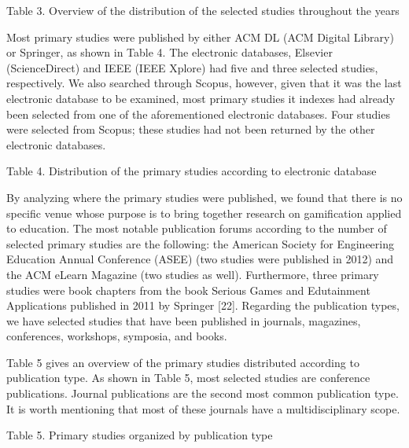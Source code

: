 Table 3. Overview of the distribution of the selected studies
throughout the years

Most primary studies were published by either ACM DL (ACM
Digital Library) or Springer, as shown in Table 4. The electronic
databases, Elsevier (ScienceDirect) and IEEE (IEEE Xplore) had
five and three selected studies, respectively. We also searched
through Scopus, however, given that it was the last electronic
database to be examined, most primary studies it indexes had
already been selected from one of the aforementioned electronic
databases. Four studies were selected from Scopus; these studies
had not been returned by the other electronic databases. 

Table 4. Distribution of the primary studies according to
electronic database

By analyzing where the primary studies were published, we found
that there is no specific venue whose purpose is to bring together
research on gamification applied to education. The most notable
publication forums according to the number of selected primary
studies are the following: the American Society for Engineering
Education Annual Conference (ASEE) (two studies were published
in 2012) and the ACM eLearn Magazine (two studies as well).
Furthermore, three primary studies were book chapters from the
book Serious Games and Edutainment Applications published in
2011 by Springer [22].
Regarding the publication types, we have selected studies that have
been published in journals, magazines, conferences, workshops, symposia, and books. 

Table 5 gives an overview of the primary studies distributed according to publication type. As shown in Table 5, most selected studies are conference publications. Journal
publications are the second most common publication type. It is worth mentioning that most of these journals have a multidisciplinary scope. 

Table 5. Primary studies organized by publication type 

